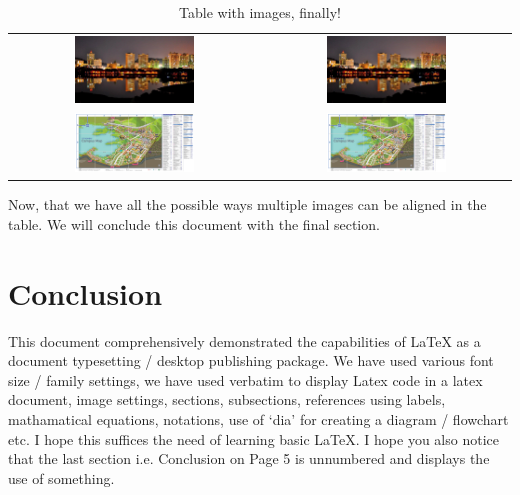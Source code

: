 \documentclass[12pt, a4paper]{article}
\begin{document}
\begin{table}[h]
\caption{Table with images, finally!}
\begin{tabular}{ c c }
\includegraphics[width=0.5\textwidth]{img3}
&
\includegraphics[width=0.5\textwidth]{img3}
\\
\includegraphics[width=0.5\textwidth]{img4}
&
\includegraphics[width=0.5\textwidth]{img4}
\\
\end{tabular}
\end{table}

Now, that we have all the possible ways multiple images can be
aligned in the table. We will conclude this document with the final
section.

\clearpage

\section*{Conclusion}
This document comprehensively demonstrated the capabilities of \LaTeX{} as a document typesetting / desktop publishing package. We have used various font size / family settings, we have used verbatim to display Latex code in a latex document, image settings, sections, subsections, references using labels, mathamatical equations, notations, use of ‘dia’ for creating a diagram / flowchart etc. I hope this suffices the need of learning basic \LaTeX{}. I hope you also notice that the last section i.e. Conclusion on Page 5 is unnumbered and displays the use of something.


 
\end{document}
